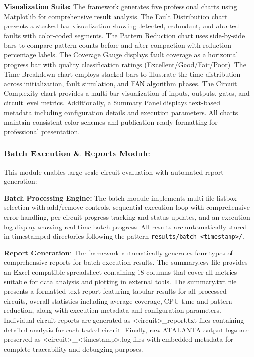 \documentclass[conference]{IEEEtran}
\begin{document}
\textbf{Visualization Suite:} The framework generates five professional charts using Matplotlib for comprehensive result analysis. The Fault Distribution chart presents a stacked bar visualization showing detected, redundant, and aborted faults with color-coded segments. The Pattern Reduction chart uses side-by-side bars to compare pattern counts before and after compaction with reduction percentage labels. The Coverage Gauge displays fault coverage as a horizontal progress bar with quality classification ratings (Excellent/Good/Fair/Poor). The Time Breakdown chart employs stacked bars to illustrate the time distribution across initialization, fault simulation, and FAN algorithm phases. The Circuit Complexity chart provides a multi-bar visualization of inputs, outputs, gates, and circuit level metrics. Additionally, a Summary Panel displays text-based metadata including configuration details and execution parameters. All charts maintain consistent color schemes and publication-ready formatting for professional presentation.

\subsubsection{Batch Execution \& Reports Module}
This module enables large-scale circuit evaluation with automated report generation:

\textbf{Batch Processing Engine:} The batch module implements multi-file listbox selection with add/remove controls, sequential execution loop with comprehensive error handling, per-circuit progress tracking and status updates, and an execution log display showing real-time batch progress. All results are automatically stored in timestamped directories following the pattern \texttt{results/batch\_<timestamp>/}.

\textbf{Report Generation:} The framework automatically generates four types of comprehensive reports for batch execution results. The summary.csv file provides an Excel-compatible spreadsheet containing 18 columns that cover all metrics suitable for data analysis and plotting in external tools. The summary.txt file presents a formatted text report featuring tabular results for all processed circuits, overall statistics including average coverage, CPU time and pattern reduction, along with execution metadata and configuration parameters. Individual circuit reports are generated as <circuit>\_report.txt files containing detailed analysis for each tested circuit. Finally, raw ATALANTA output logs are preserved as <circuit>\_<timestamp>.log files with embedded metadata for complete traceability and debugging purposes.
\end{document}
